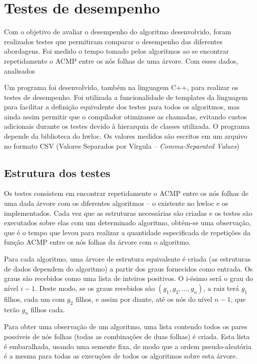 
\chapter{Testes de desempenho}

Com o objetivo de avaliar o desempenho do algoritmo desenvolvido, foram realizados testes
que permitiram comparar o desempenho das diferentes abordagens.
Foi medido o tempo tomado pelos algoritmos
ao se encontrar repetidamente o ACMP entre os nós folhas de uma árvore.
Com esses dados, analisados

Um programa foi desenvolvido, também na linguagem C++, para realizar os testes de desempenho.
Foi utilizada a funcionalidade de templates da linguagem para facilitar a definição equivalente dos testes para todos os algoritmos, mas ainda assim permitir que o compilador otimizasse as chamadas, evitando custos adicionais durante os testes devido à hierarquia de classes utilizada.
O programa depende da biblioteca do hwloc.
Os valores medidos são escritos em um arquivo no formato CSV (Valores Separados por Vírgula -- \textit{Comma-Separated Values})

\section{Estrutura dos testes}

Os testes consistem em encontrar repetidamente o ACMP entre os nós folhas de uma dada árvore com os diferentes algoritmos -- o existente no hwloc e os implementados.
Cada vez que as estruturas necessárias são criadas e os testes são executados sobre elas com um determinado algoritmo, obtém-se uma observação, que é o tempo que levou para realizar a quantidade especificada de repetições da função ACMP entre os nós folhas da árvore com o algoritmo.

Para cada algoritmo, uma árvore de estrutura equivalente é criada (as estruturas de dados dependem do algoritmo) a partir dos graus fornecidos como entrada.
Os graus são recebidos como uma lista de inteiros positivos.
O i-ésimo será o grau do nível $i-1$.
Deste modo, se os graus recebidos são $(g_1, g_2, ..., g_n)$, a raiz terá $g_1$ filhos, cada um com $g_2$ filhos, e assim por diante, até os nós do nível $n-1$, que terão $g_n$ filhos cada.

Para obter uma observação de um algoritmo, uma lista contendo todos os pares possíveis de nós folhas (todas as combinações de duas folhas) é criada.
Esta lista é embaralhada, usando uma semente fixa, de modo que a ordem pseudo-aleatória é a mesma para todas as execuções de todos os algoritmos sobre esta árvore.

